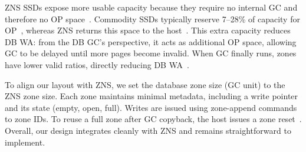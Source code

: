 ZNS SSDs expose more usable capacity because they require no internal GC and therefore no OP space~\cite{DBLP:conf/usenix/BjorlingAHRMGA21}.  
Commodity SSDs typically reserve 7--28\% of capacity for OP~\cite{DBLP:conf/fast/ManeasMES22}, whereas ZNS returns this space to the host~\cite{DBLP:conf/fast/YadgarYS15}.  
This extra capacity reduces DB WA: from the DB GC’s perspective, it acts as additional OP space, allowing GC to be delayed until more pages become invalid.  
When GC finally runs, zones have lower valid ratios, directly reducing DB WA~\cite{arkiv/Dayan15}.

To align our layout with ZNS, we set the database zone size (GC unit) to the ZNS zone size.  
Each zone maintains minimal metadata, including a write pointer and its state (empty, open, full).  
Writes are issued using zone-append commands to zone IDs.  
To reuse a full zone after GC copyback, the host issues a zone reset~\cite{DBLP:conf/usenix/BjorlingAHRMGA21}.  
Overall, our design integrates cleanly with ZNS and remains straightforward to implement.
